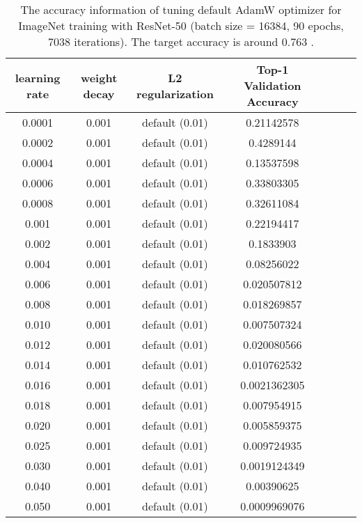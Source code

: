 \documentclass{article} \usepackage{iclr2020_conference,times}
\begin{document}
\begin{table}[ht]
\renewcommand{\arraystretch}{1.3}
\caption{The accuracy information of tuning default AdamW optimizer for ImageNet training with ResNet-50 (batch size = 16384, 90 epochs, 7038 iterations). The target accuracy is around 0.763 \citep{goyal2017accurate}.}
\centering
\begin{tabular}{|c|c|c|c|c|c|c|}
\hline
learning rate & weight decay & L2 regularization & Top-1 Validation Accuracy\\
\hline
\hline
0.0001 & 0.001 & default (0.01) & 0.21142578 \\
\hline
0.0002 & 0.001 & default (0.01) & 0.4289144 \\
\hline
0.0004 & 0.001 & default (0.01) & 0.13537598 \\
\hline
0.0006 & 0.001 & default (0.01) & 0.33803305 \\
\hline
0.0008 & 0.001 & default (0.01) & 0.32611084 \\
\hline
0.001 & 0.001 & default (0.01) & 0.22194417 \\
\hline
0.002 & 0.001 & default (0.01) & 0.1833903 \\
\hline
0.004 & 0.001 & default (0.01) & 0.08256022 \\
\hline
0.006 & 0.001 & default (0.01) & 0.020507812 \\
\hline
0.008 & 0.001 & default (0.01) & 0.018269857 \\
\hline
0.010 & 0.001 & default (0.01) & 0.007507324 \\
\hline
0.012 & 0.001 & default (0.01) & 0.020080566 \\
\hline
0.014 & 0.001 & default (0.01) & 0.010762532 \\
\hline
0.016 & 0.001 & default (0.01) & 0.0021362305 \\
\hline
0.018 & 0.001 & default (0.01) & 0.007954915 \\
\hline
0.020 & 0.001 & default (0.01) & 0.005859375 \\
\hline
0.025 & 0.001 & default (0.01) & 0.009724935 \\
\hline
0.030 & 0.001 & default (0.01) & 0.0019124349 \\
\hline
0.040 & 0.001 & default (0.01) & 0.00390625 \\
\hline
0.050 & 0.001 & default (0.01) & 0.0009969076 \\
\hline
\end{tabular}
\label{table:imagenet_adamw_default_l2_3}
\end{table}
\end{document}
